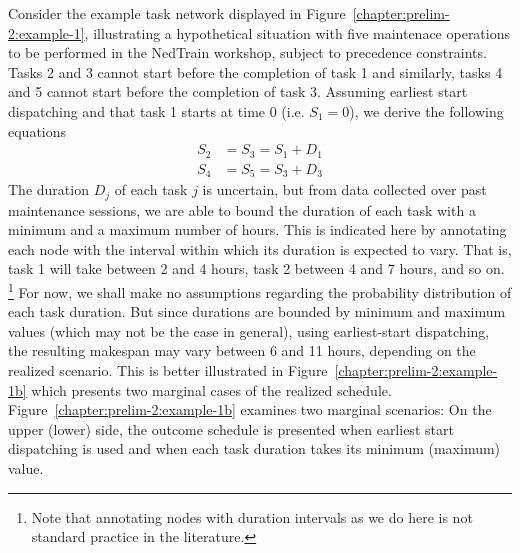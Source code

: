 	\begin{example}
		Consider the example task network displayed in Figure~\ref{chapter:prelim-2:example-1},
		illustrating a hypothetical situation with five maintenace operations to be performed in the NedTrain workshop, subject to precedence constraints.
		Tasks 2 and 3 cannot start before the completion of task 1 and similarly, tasks 4 and 5 cannot start before the completion of task 3.
		Assuming earliest start dispatching and that task 1 starts at time 0 (i.e. $S_1 = 0$), we derive the following equations
		\begin{align*}
			S_2 & = S_3 = S_1 + D_1 \\
			S_4 & = S_5 = S_3 + D_3 
		\end{align*}
		The duration $D_j$ of each task $j$ is uncertain, but from data collected over past maintenance sessions,
		we are able to bound the duration of each task with a minimum and a maximum number of hours.
		This is indicated here by annotating each node with the interval within which its duration is expected to vary.
		That is, task 1 will take between 2 and 4 hours, task 2 between 4 and 7 hours, and so on.%
		\footnote{Note that annotating nodes with duration intervals as we do here is not standard practice in the literature.}%
		For now, we shall make no assumptions regarding the probability distribution of each task duration.
		But since durations are bounded by minimum and maximum values (which may not be the case in general),
		using earliest-start dispatching, the resulting makespan may vary between 6 and 11 hours, depending on the realized scenario.
		This is better illustrated in Figure~\ref{chapter:prelim-2:example-1b} which presents two marginal cases of the realized schedule.
		Figure~\ref{chapter:prelim-2:example-1b} examines two marginal scenarios:
		On the upper (lower) side, the outcome schedule is presented when earliest start dispatching is used and 
		when each task duration takes its minimum (maximum) value.
	\end{example}

